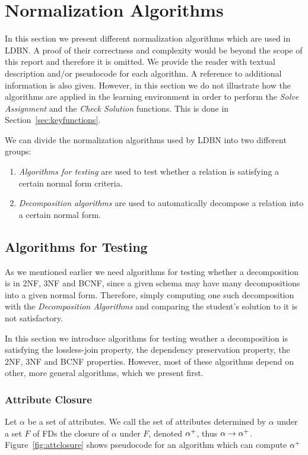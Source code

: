 \section{Normalization Algorithms}
\label{sec:alg}
In this section we present different normalization algorithms which are used
in LDBN. A proof of their correctness and complexity would be beyond the 
scope of this report and therefore it is omitted. We provide the
reader with textual description and/or pseudocode for each algorithm. 
A reference to additional information is also given. However, in this section we do not
illustrate how the algorithms are applied in the learning environment in order
to perform the \textit{Solve Assignment} and the \textit{Check Solution} functions.
This is done in Section~\ref{sec:keyfunctions}.

We can divide the normalization algorithms used by LDBN into two different groups:

\begin{enumerate}
  \item \textit{Algorithms for testing} are used to test whether a relation is satisfying a certain normal form criteria.
  \item \textit{Decomposition algorithms} are used to automatically decompose a relation into a certain normal form.
\end{enumerate}

\subsection{Algorithms for Testing}
\label{sec:algtest}
As we mentioned earlier we need algorithms for testing whether a decomposition 
is in 2NF, 3NF and BCNF, since a given schema may have many decompositions into a given normal form. Therefore,
simply computing one such decomposition with the \textit{Decomposition Algorithms} and comparing the student's solution to it is
not satisfactory. 

In this section we introduce algorithms for testing weather a decomposition 
is satisfying the lossless-join property, the
dependency preservation property, the 2NF, 3NF and BCNF properties. 
However, most of these algorithms depend on other, more general
algorithms, which we present first.  

\subsubsection{Attribute Closure}
Let $\alpha$  be a set of attributes. 
We call the set of attributes determined by $\alpha$ under a set $F$ of 
FDs the closure of $\alpha$ under $F$, denoted $\alpha\sp{+}$, thus \(\alpha \rightarrow \alpha\sp{+}\).
Figure~\ref{fig:attclosure} shows  pseudocode for an algorithm which can compute $\alpha\sp{+}$

